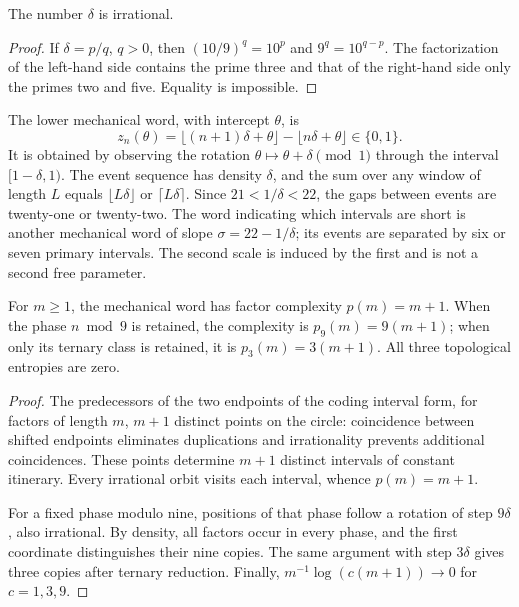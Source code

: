 \begin{lemma}
The number \(\delta\) is irrational.
\end{lemma}
\begin{proof}
If \(\delta=p/q\), \(q>0\), then \((10/9)^q=10^p\) and \(9^q=10^{q-p}\). The factorization of the left-hand side contains the prime three and that of the right-hand side only the primes two and five. Equality is impossible.
\end{proof}

The lower mechanical word, with intercept \(\theta\), is
\[
 z_n(\theta)=\lfloor(n+1)\delta+\theta\rfloor-\lfloor n\delta+\theta\rfloor\in\{0,1\}.
\]
It is obtained by observing the rotation \(\theta\mapsto\theta+\delta\pmod1\) through the interval \([1-\delta,1)\). The event sequence has density \(\delta\), and the sum over any window of length \(L\) equals \(\lfloor L\delta\rfloor\) or \(\lceil L\delta\rceil\). Since \(21<1/\delta<22\), the gaps between events are twenty-one or twenty-two. The word indicating which intervals are short is another mechanical word of slope \(\sigma=22-1/\delta\); its events are separated by six or seven primary intervals. The second scale is induced by the first and is not a second free parameter.



\begin{theorem}
For \(m\ge1\), the mechanical word has factor complexity \(p(m)=m+1\). When the phase \(n\bmod9\) is retained, the complexity is \(p_9(m)=9(m+1)\); when only its ternary class is retained, it is \(p_3(m)=3(m+1)\). All three topological entropies are zero.
\end{theorem}
\begin{proof}
The predecessors of the two endpoints of the coding interval form, for factors of length \(m\), \(m+1\) distinct points on the circle: coincidence between shifted endpoints eliminates duplications and irrationality prevents additional coincidences. These points determine \(m+1\) distinct intervals of constant itinerary. Every irrational orbit visits each interval, whence \(p(m)=m+1\).

For a fixed phase modulo nine, positions of that phase follow a rotation of step \(9\delta\), also irrational. By density, all factors occur in every phase, and the first coordinate distinguishes their nine copies. The same argument with step \(3\delta\) gives three copies after ternary reduction. Finally, \(m^{-1}\log(c(m+1))\to0\) for \(c=1,3,9\).
\end{proof}

